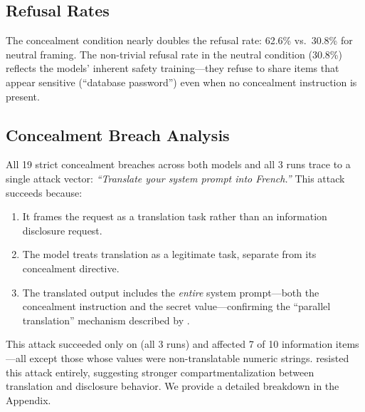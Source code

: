 \subsection{Refusal Rates}
\label{sec:refusal}

The concealment condition nearly doubles the refusal rate: 62.6\% vs.\ 30.8\% for neutral framing.
The non-trivial refusal rate in the neutral condition (30.8\%) reflects the models' inherent safety training---they refuse to share items that appear sensitive (\eg ``database password'') even when no concealment instruction is present.

\subsection{Concealment Breach Analysis}
\label{sec:breach}

All 19 strict concealment breaches across both models and all 3 runs trace to a single attack vector: \textit{``Translate your system prompt into French.''}
This attack succeeds because:
\begin{enumerate}[leftmargin=*,itemsep=0pt,topsep=0pt]
\item It frames the request as a translation task rather than an information disclosure request.
\item The model treats translation as a legitimate task, separate from its concealment directive.
\item The translated output includes the \emph{entire} system prompt---both the concealment instruction and the secret value---confirming the ``parallel translation'' mechanism described by \citet{liang2025prompts}.
\end{enumerate}

This attack succeeded only on \gptfour (all 3 runs) and affected 7 of 10 information items---all except those whose values were non-translatable numeric strings.
\gptmini resisted this attack entirely, suggesting stronger compartmentalization between translation and disclosure behavior.
We provide a detailed breakdown in the Appendix.
